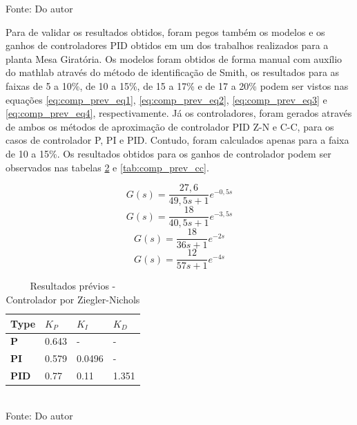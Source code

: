 \begin{table}[H]
\begin{tabular}{|c|c|c|c|c|c|c|}
        \hline
    \end{tabular}
    \label{tab:results_tanque}
    \vspace{0cm}\hspace{0cm}\small{Fonte: Do autor}
\end{table}

Para de validar os resultados obtidos, foram pegos também os modelos e os ganhos de controladores PID obtidos em um dos
trabalhos realizados para a planta Mesa Giratória.
Os modelos foram obtidos de forma manual com auxílio do mathlab através do método de identificação de Smith, os
resultados para as faixas de 5 a 10\%, de 10 a 15\%, de 15 a 17\% e de 17 a 20\% podem ser vistos nas equações
\ref{eq:comp_prev_eq1}, \ref{eq:comp_prev_eq2}, \ref{eq:comp_prev_eq3} e \ref{eq:comp_prev_eq4}, respectivamente.
Já os controladores, foram gerados através de ambos os métodos de aproximação de controlador PID Z-N e C-C, para os
casos de controlador P, PI e PID. Contudo, foram calculados apenas para a faixa de 10 a 15\%.
Os resultados obtidos para os ganhos de controlador podem ser observados nas tabelas
\ref{tab:comp_prev_zn} e \ref{tab:comp_prev_cc}.

\begin{equation}
    \label{eq:comp_prev_eq1}
    G(s) = \frac{27,6}{49,5 s + 1}e^{-0,5 s}
\end{equation}
\begin{equation}
    \label{eq:comp_prev_eq2}
    G(s) = \frac{18}{40,5 s + 1}e^{-3,5 s}
\end{equation}
\begin{equation}
    \label{eq:comp_prev_eq3}
    G(s) = \frac{18}{36 s + 1}e^{-2 s}
\end{equation}
\begin{equation}
    \label{eq:comp_prev_eq4}
    G(s) = \frac{12}{57 s + 1}e^{-4 s}
\end{equation}

\begin{table}[H]
    \caption{Resultados prévios - Controlador por Ziegler-Nichols}
    \centering
    \begin{tabular}{|l|l|l|l|}
        \hline
        \textbf{Type} & \textbf{$K_P$} & \textbf{$K_I$} & \textbf{$K_D$} \\
        \hline
        \textbf{P}    & 0.643          & -              & -              \\
        \hline
        \textbf{PI}   & 0.579          & 0.0496         & -              \\
        \hline
        \textbf{PID}  & 0.77           & 0.11           & 1.351          \\
        \hline
    \end{tabular}
    \label{tab:comp_prev_zn}
    \\
    \vspace{0cm}\hspace{0cm}\small{Fonte: Do autor}
\end{table}

